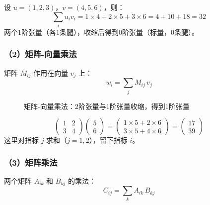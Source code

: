\documentclass[12pt,a4paper]{ctexart}
\begin{document}
\begin{examplebox}[例4：向量内积的张量收缩]
设 $u = (1, 2, 3)$，$v = (4, 5, 6)$，则：
\[
\sum_i u_i v_i = 1\times 4 + 2\times 5 + 3\times 6 = 4 + 10 + 18 = 32
\]
两个1阶张量（各1条腿），收缩后得到0阶张量（标量，0条腿）。
\end{examplebox}

\subsubsection{（2）矩阵-向量乘法}

矩阵 $M_{ij}$ 作用在向量 $v_j$ 上：
\begin{equation}
    w_i = \sum_j M_{ij} \, v_j
\end{equation}

\begin{figure}[H]
\centering
{}
\caption{矩阵-向量乘法：2阶张量与1阶张量收缩，得到1阶张量}
\end{figure}

\begin{examplebox}[例5：矩阵-向量乘法]
\[
\begin{pmatrix} 1 & 2 \\ 3 & 4 \end{pmatrix} \begin{pmatrix} 5 \\ 6 \end{pmatrix}
= \begin{pmatrix} 1\times5 + 2\times6 \\ 3\times5 + 4\times6 \end{pmatrix}
= \begin{pmatrix} 17 \\ 39 \end{pmatrix}
\]
这里对指标 $j$ 求和（$j=1,2$），留下指标 $i$。
\end{examplebox}

\subsubsection{（3）矩阵乘法}

两个矩阵 $A_{ik}$ 和 $B_{kj}$ 的乘法：
\begin{equation}
    C_{ij} = \sum_k A_{ik} \, B_{kj}
\end{equation}
\end{document}
